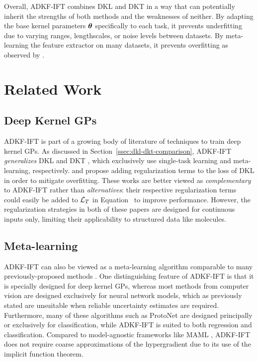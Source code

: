     Overall, ADKF-IFT combines DKL and DKT in a way that can potentially inherit the strengths of both methods
    and the weaknesses of neither.
    By adapting the base kernel parameters $\operatorname{\boldsymbol{\theta}}$ specifically to each task, it prevents underfitting due to varying ranges,
    lengthscales, or noise levels between datasets. By meta-learning the feature extractor on many datasets,
    it prevents overfitting as observed by \citet{ober21a}.
    

\section{Related Work}\label{sec:adkf:related-work}

    \subsection{Deep Kernel GPs}
    ADKF-IFT is part of a growing body of literature of techniques to train deep kernel GPs.
    As discussed in Section~\ref{ssec:dkl-dkt-comparison},
    ADKF-IFT \emph{generalizes} DKL \citep{wilson2016deep} and DKT \citep{Patacchiola20},
    which exclusively use single-task learning and meta-learning, respectively.
    \citet{liu2020simple} and \citet{van2021feature} propose adding regularization terms to the loss of DKL
    in order to mitigate overfitting.
    These works are better viewed as \emph{complementary} to ADKF-IFT rather than \emph{alternatives}:
    their respective regularization terms could easily be added to $\operatorname{\mathcal{L}}_T$ in Equation~
    to improve performance.
    However, the regularization strategies in both of these papers are designed for continuous inputs only,
    limiting their applicability to structured data like molecules.

    \subsection{Meta-learning}
    ADKF-IFT can also be viewed as a meta-learning algorithm
    comparable to many previously-proposed methods
    \citep{lake2011one,vinyals16,garnelo18a,triantafillou2019meta,Park2019meta,tian2020rethinking,chen2021self,liu2021meta,wistuba2021few,patacchiola2022contextual}.
    One distinguishing feature of ADKF-IFT is that it is specially designed for deep kernel GPs,
    whereas most methods from computer vision are designed exclusively for neural network models,
    which as previously stated are unsuitable when reliable uncertainty estimates are required.
    Furthermore, many of these algorithms such as ProtoNet \citep{snell2017prototypical} are designed principally or exclusively for classification,
    while ADKF-IFT is suited to both regression and classification.
    Compared to model-agnostic frameworks like MAML \citep{finn17a},
    ADKF-IFT does not require coarse approximations of the hypergradient due to its use of the implicit function theorem.

